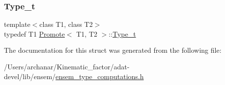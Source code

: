 \mbox{\label{structPromote_a85c0d5fa03b60c087ac52aab76ccb930}} 
\subsubsection{\texorpdfstring{Type\_t}{Type\_t}\hspace{0.1cm}{\footnotesize\ttfamily [3/3]}}
{\footnotesize\ttfamily template$<$class T1, class T2$>$ \\
typedef T1 \mbox{\hyperlink{structPromote}{Promote}}$<$ T1, T2 $>$\+::\mbox{\hyperlink{structPromote_a85c0d5fa03b60c087ac52aab76ccb930}{Type\+\_\+t}}}



The documentation for this struct was generated from the following file\+:\begin{DoxyCompactItemize}
\item 
/\+Users/archanar/\+Kinematic\+\_\+factor/adat-\/devel/lib/ensem/\mbox{\hyperlink{adat-devel_2lib_2ensem_2ensem__type__computations_8h}{ensem\+\_\+type\+\_\+computations.\+h}}\end{DoxyCompactItemize}
